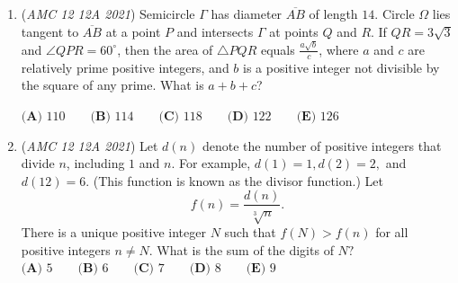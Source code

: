 \begin{enumerate}
 $\textbf{(A) }\frac{9}{16} \qquad \textbf{(B) }\frac{5}{8} \qquad \textbf{(C) }\frac34 \qquad \textbf{(D) }\frac{25}{32}\qquad \textbf{(E) }\frac{13}{16}$


	\item (\textit{AMC 12 12A 2021}) Semicircle $\Gamma$ has diameter $\overline{AB}$ of length $14$. Circle $\Omega$ lies tangent to $\overline{AB}$ at a point $P$ and intersects $\Gamma$ at points $Q$ and $R$. If $QR=3\sqrt3$ and $\angle QPR=60^\circ$, then the area of $\triangle PQR$ equals $\frac{a\sqrt{b}}{c}$, where $a$ and $c$ are relatively prime positive integers, and $b$ is a positive integer not divisible by the square of any prime. What is $a+b+c$?


 $\textbf{(A) }110 \qquad \textbf{(B) }114 \qquad \textbf{(C) }118 \qquad \textbf{(D) }122\qquad \textbf{(E) }126$


	\item (\textit{AMC 12 12A 2021}) Let $d(n)$ denote the number of positive integers that divide $n$, including $1$ and $n$. For example, $d(1)=1,d(2)=2,$ and $d(12)=6$. (This function is known as the divisor function.) Let
 \[f(n)=\frac{d(n)}{\sqrt [3]n}.\]There is a unique positive integer $N$ such that $f(N)>f(n)$ for all positive integers $n\ne N$. What is the sum of the digits of $N?$
$\textbf{(A) }5 \qquad \textbf{(B) }6 \qquad \textbf{(C) }7 \qquad \textbf{(D) }8\qquad \textbf{(E) }9$


\end{enumerate}